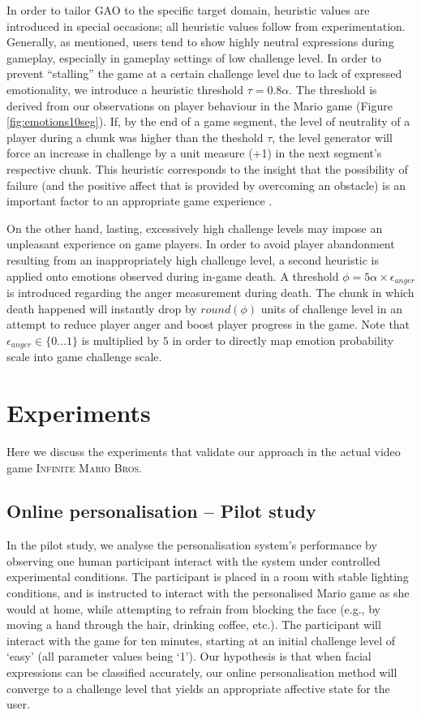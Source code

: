 \documentclass[letterpaper]{article}
\begin{document}
In order to tailor GAO to the specific target domain, heuristic values are introduced in special occasions; all heuristic values follow from experimentation. Generally, as mentioned, users tend to show highly neutral expressions during gameplay, especially in gameplay settings of low challenge level. In order to prevent ``stalling'' the game at a certain challenge level due to lack of expressed emotionality, we introduce a heuristic threshold $\tau = 0.8\alpha$. The threshold is derived from our observations on player behaviour in the Mario game (Figure \ref{fig:emotions10seg}). If, by the end of a game segment, the level of neutrality of a player during a chunk was higher than the theshold $\tau$, the level generator will force an increase in challenge by a unit measure (+1) in the next segment's respective chunk. This heuristic corresponds to the insight that the possibility of failure (and the positive affect that is provided by overcoming an obstacle) is an important factor to an appropriate game experience \cite{juul2013art}.

On the other hand, lasting, excessively high challenge levels may impose an unpleasant experience on game players. In order to avoid player abandonment resulting from an inappropriately high challenge level, a second heuristic is applied onto emotions observed during in-game death. A threshold $\phi = 5\alpha\times\epsilon_{anger}$ is introduced regarding the anger measurement during death. The chunk in which death happened will instantly drop by $round(\phi)$ units of challenge level in an attempt to reduce player anger and boost player progress in the game. Note that $\epsilon_{anger} \in \{0...1\}$ is multiplied by $5$ in order to directly map emotion probability scale into game challenge scale.




\section{Experiments}\label{sec:experiments}

Here we discuss the experiments that validate our approach in the actual video game \textsc{Infinite Mario Bros.}

\subsection{Online personalisation -- Pilot study}\label{exp1}

In the pilot study, we analyse the personalisation system's performance by observing one human participant interact with the system under controlled experimental conditions. The participant is placed in a room with stable lighting conditions, and is instructed to interact with the personalised Mario game as she would at home, while attempting to refrain from blocking the face (e.g., by moving a hand through the hair, drinking coffee, etc.). The participant will interact with the game for ten minutes, starting at an initial challenge level of `easy' (all parameter values being `1'). Our hypothesis is that when facial expressions can be classified accurately, our online personalisation method will converge to a challenge level that yields an appropriate affective state for the user.
\end{document}

